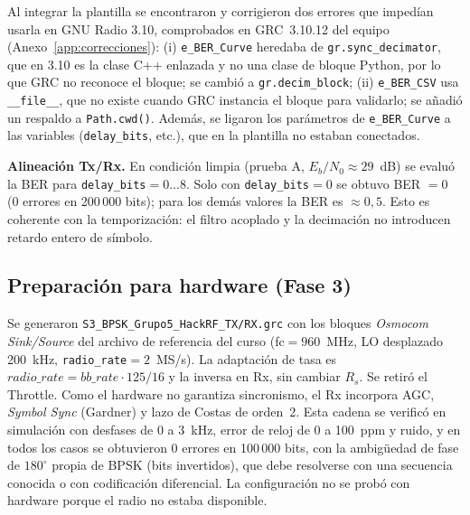 Al integrar la plantilla se encontraron y corrigieron dos errores que impedían usarla en GNU Radio 3.10, comprobados en GRC~3.10.12 del equipo (Anexo~\ref{app:correcciones}): (i) \texttt{e\_BER\_Curve} heredaba de \texttt{gr.sync\_decimator}, que en 3.10 es la clase C++ enlazada y no una clase de bloque Python, por lo que GRC no reconoce el bloque; se cambió a \texttt{gr.decim\_block}; (ii) \texttt{e\_BER\_CSV} usa \texttt{\_\_file\_\_}, que no existe cuando GRC instancia el bloque para validarlo; se añadió un respaldo a \texttt{Path.cwd()}. Además, se ligaron los parámetros de \texttt{e\_BER\_Curve} a las variables (\texttt{delay\_bits}, etc.), que en la plantilla no estaban conectados.

\textbf{Alineación Tx/Rx.} En condición limpia (prueba A, $E_b/N_0\approx29$~dB) se evaluó la BER para \texttt{delay\_bits}$=0\ldots8$. Solo con \texttt{delay\_bits}$=0$ se obtuvo BER $=0$ (0 errores en 200\,000 bits); para los demás valores la BER es $\approx0{,}5$. Esto es coherente con la temporización: el filtro acoplado y la decimación no introducen retardo entero de símbolo.

\subsection{Preparación para hardware (Fase 3)}
Se generaron \texttt{S3\_BPSK\_Grupo5\_HackRF\_TX/RX.grc} con los bloques \emph{Osmocom Sink/Source} del archivo de referencia del curso (fc$=960$~MHz, LO desplazado 200~kHz, \texttt{radio\_rate}$=2$~MS/s). La adaptación de tasa es $radio\_rate=bb\_rate\cdot125/16$ y la inversa en Rx, sin cambiar $R_s$. Se retiró el Throttle. Como el hardware no garantiza sincronismo, el Rx incorpora AGC, \emph{Symbol Sync} (Gardner) \cite{gnuradio_symsync} y lazo de Costas de orden~2. Esta cadena se verificó en simulación con desfases de 0 a 3~kHz, error de reloj de 0 a 100~ppm y ruido, y en todos los casos se obtuvieron 0 errores en 100\,000 bits, con la ambigüedad de fase de $180^\circ$ propia de BPSK (bits invertidos), que debe resolverse con una secuencia conocida o con codificación diferencial. La configuración no se probó con hardware porque el radio no estaba disponible.
